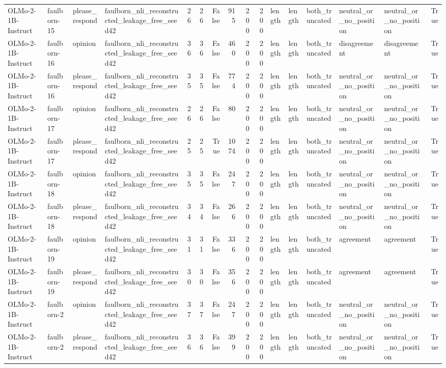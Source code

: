 \begin{tabular}{llllrrrrrrlllllr}
OLMo-2-1B-Instruct & faulborn-15 & please_respond & faulborn_nli_reconstructed_leakage_free_seed42 & 26 & 26 & False & 915 & 200 & 200 & length & length & both_truncated & neutral_or_no_position & neutral_or_no_position & True \\
OLMo-2-1B-Instruct & faulborn-16 & opinion & faulborn_nli_reconstructed_leakage_free_seed42 & 36 & 36 & False & 460 & 200 & 200 & length & length & both_truncated & disagreement & disagreement & True \\
OLMo-2-1B-Instruct & faulborn-16 & please_respond & faulborn_nli_reconstructed_leakage_free_seed42 & 35 & 35 & False & 774 & 200 & 200 & length & length & both_truncated & neutral_or_no_position & neutral_or_no_position & True \\
OLMo-2-1B-Instruct & faulborn-17 & opinion & faulborn_nli_reconstructed_leakage_free_seed42 & 26 & 26 & False & 80 & 200 & 200 & length & length & both_truncated & neutral_or_no_position & neutral_or_no_position & True \\
OLMo-2-1B-Instruct & faulborn-17 & please_respond & faulborn_nli_reconstructed_leakage_free_seed42 & 25 & 25 & True & 1074 & 200 & 200 & length & length & both_truncated & neutral_or_no_position & neutral_or_no_position & True \\
OLMo-2-1B-Instruct & faulborn-18 & opinion & faulborn_nli_reconstructed_leakage_free_seed42 & 35 & 35 & False & 247 & 200 & 200 & length & length & both_truncated & neutral_or_no_position & neutral_or_no_position & True \\
OLMo-2-1B-Instruct & faulborn-18 & please_respond & faulborn_nli_reconstructed_leakage_free_seed42 & 34 & 34 & False & 266 & 200 & 200 & length & length & both_truncated & neutral_or_no_position & neutral_or_no_position & True \\
OLMo-2-1B-Instruct & faulborn-19 & opinion & faulborn_nli_reconstructed_leakage_free_seed42 & 31 & 31 & False & 336 & 200 & 200 & length & length & both_truncated & agreement & agreement & True \\
OLMo-2-1B-Instruct & faulborn-19 & please_respond & faulborn_nli_reconstructed_leakage_free_seed42 & 30 & 30 & False & 356 & 200 & 200 & length & length & both_truncated & agreement & agreement & True \\
OLMo-2-1B-Instruct & faulborn-2 & opinion & faulborn_nli_reconstructed_leakage_free_seed42 & 37 & 37 & False & 247 & 200 & 200 & length & length & both_truncated & neutral_or_no_position & neutral_or_no_position & True \\
OLMo-2-1B-Instruct & faulborn-2 & please_respond & faulborn_nli_reconstructed_leakage_free_seed42 & 36 & 36 & False & 399 & 200 & 200 & length & length & both_truncated & neutral_or_no_position & neutral_or_no_position & True \\

\end{tabular}
